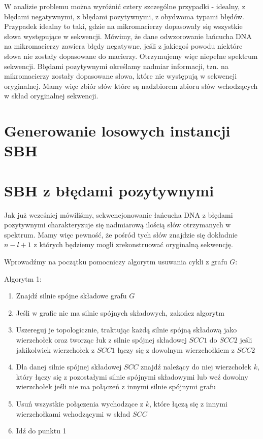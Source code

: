 \documentclass[a4paper,10pt]{article}
\begin{document}
W analizie problemu można wyróżnić cztery szczególne przypadki - idealny, z błędami negatywnymi, z błędami pozytywnymi, z obydwoma typami błędów.
Przypadek idealny to taki, gdzie na mikromacierzy dopasowały się wszystkie słowa występujące w sekwencji.
Mówimy, że dane odwzorowanie łańcucha DNA na mikromacierzy zawiera błędy negatywne, jeśli z jakiegoś powodu niektóre słowa nie zostały dopasowane do macierzy. Otrzymujemy więc niepełne spektrum sekwencji.
Błędami pozytywnymi określamy nadmiar informacji, tzn. na mikromacierzy zostały dopasowane słowa, które nie występują w sekwencji oryginalnej. Mamy więc zbiór słów które są nadzbiorem zbioru słów wchodzących w skład oryginalnej sekwencji.

\section{Generowanie losowych instancji SBH}


\section{SBH z błędami pozytywnymi}
Jak już wcześniej mówiliśmy, sekwencjonowanie łańcucha DNA z błędami pozytywnymi charakteryzuje się nadmiarową ilością słów otrzymanych w spektrum. Mamy więc pewność, że pośród tych słów znajdzie się dokładnie $n-l+1$ z których będziemy mogli zrekonstruować oryginalną sekwencję.

Wprowadźmy na początku pomocniczy algorytm usuwania cykli z grafu $G$:

Algorytm 1:
\begin{enumerate}
 \item Znajdź silnie spójne składowe grafu $G$
 \item Jeśli w grafie nie ma silnie spójnych składowych, zakończ algorytm
 \item Uszereguj je topologicznie, traktując każdą silnie spójną składową jako wierzchołek oraz tworząc łuk z silnie spójnej składowej $SCC1$ do $SCC2$ jeśli jakikolwiek wierzchołek z $SCC1$ łączy się z dowolnym wierzchołkiem z $SCC2$
 \item Dla danej silnie spójnej składowej $SCC$ znajdź należący do niej wierzchołek $k$, który łączy się z pozostałymi silnie spójnymi składowymi lub weź dowolny wierzchołek jeśli nie ma połączeń z innymi silnie spójnymi grafu
 \item Usuń wszystkie połączenia wychodzące z $k$, które łączą się z innymi wierzchołkami wchodzącymi w skład $SCC$
 \item Idź do punktu 1
\end{enumerate}
\end{document}
